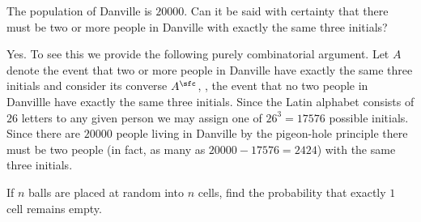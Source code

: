 \begin{problem}[DasGupta, 1.5]
  The population of Danville is \(20000\). Can it be said with certainty
  that there must be two or more people in Danville with exactly the same
  three initials?
\end{problem}
\begin{solution}
  Yes. To see this we provide the following purely combinatorial
  argument. Let \(A\) denote the event that two or more people in Danville
  have exactly the same three initials and consider its converse
  \(A^\sfc\), \ie{}, the event that no two people in Danvillle have
  exactly the same three initials. Since the Latin alphabet consists of
  \(26\) letters to any given person we may assign one of \(26^3=17576\)
  possible initials. Since there are \(20000\) people living in Danville by
  the pigeon-hole principle there must be two people (in fact, as many as
  \(20000-17576=2424\)) with the same three initials.
\end{solution}
\newpage

\begin{solution}
\end{solution}
\newpage

\begin{problem}
  If \(n\) balls are placed at random into \(n\) cells, find the
  probability that exactly \(1\) cell remains empty.
\end{problem}
\begin{solution}
\end{solution}
\newpage


